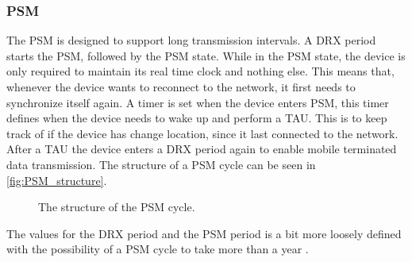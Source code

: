 \subsubsection{PSM}
The PSM is designed to support long transmission intervals. A DRX period starts the PSM, followed by the PSM state. While in the PSM state, the device is only required to maintain its real time clock and nothing else. This means that, whenever the device wants to reconnect to the network, it first needs to synchronize itself again. A timer is set when the device enters PSM, this timer defines when the device needs to wake up and perform a \gls{TAU}. This is to keep track of if the device has change location, since it last connected to the network. After a TAU the device enters a DRX period again to enable mobile terminated data transmission. The structure of a PSM cycle can be seen in \autoref{fig:PSM_structure}.

\begin{figure}[H]
\centering
\resizebox{\textwidth}{!}{
}
\caption{The structure of the \gls{PSM} cycle.}
\label{fig:PSM_structure}
\end{figure}

The values for the DRX period and the PSM period is a bit more loosely defined with the possibility of a PSM cycle to take more than a year \citep{NB-IoT_Book}.




